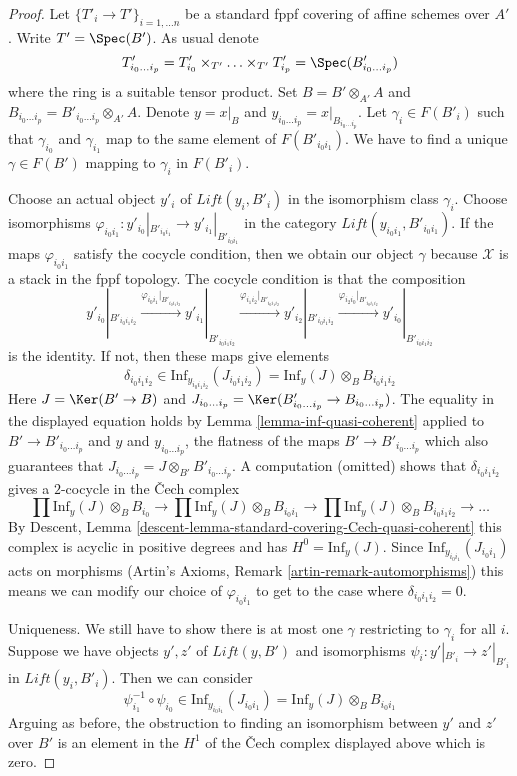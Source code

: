\begin{proof}
Let $\{T'_i \to T'\}_{i = 1, \ldots n}$ be a standard fppf covering
of affine schemes over $A'$. Write $T' = \Spec(B')$. As usual denote
$$
T'_{i_0 \ldots i_p} =
T'_{i_0} \times_{T'} \ldots \times_{T'} T'_{i_p} = \Spec(B'_{i_0 \ldots i_p})
$$
where the ring is a suitable tensor product.
Set $B = B' \otimes_{A'} A$ and
$B_{i_0 \ldots i_p} = B'_{i_0 \ldots i_p} \otimes_{A'} A$.
Denote $y = x|_B$ and $y_{i_0 \ldots i_p} = x|_{B_{i_0 \ldots i_p}}$.
Let $\gamma_i \in F(B'_i)$ such that $\gamma_{i_0}$ and $\gamma_{i_1}$
map to the same element of $F(B'_{i_0i_1})$.
We have to find a unique $\gamma \in F(B')$ mapping to
$\gamma_i$ in $F(B'_i)$.

\medskip\noindent
Choose an actual object $y'_i$ of $\textit{Lift}(y_i, B'_i)$
in the isomorphism class $\gamma_i$.
Choose isomorphisms
$\varphi_{i_0i_1} : y'_{i_0}|_{B'_{i_0i_1}} \to y'_{i_1}|_{B'_{i_0i_1}}$
in the category $\textit{Lift}(y_{i_0i_1}, B'_{i_0i_1})$.
If the maps $\varphi_{i_0i_1}$ satisfy the cocycle condition,
then we obtain our object $\gamma$ because $\mathcal{X}$ is
a stack in the fppf topology. The cocycle condition is that the
composition
$$
y'_{i_0}|_{B'_{i_0i_1i_2}}
\xrightarrow{\varphi_{i_0i_1}|_{B'_{i_0i_1i_2}}}
y'_{i_1}|_{B'_{i_0i_1i_2}}
\xrightarrow{\varphi_{i_1i_2}|_{B'_{i_0i_1i_2}}}
y'_{i_2}|_{B'_{i_0i_1i_2}}
\xrightarrow{\varphi_{i_2i_0}|_{B'_{i_0i_1i_2}}}
y'_{i_0}|_{B'_{i_0i_1i_2}}
$$
is the identity. If not, then these maps give elements
$$
\delta_{i_0i_1i_2} \in
\text{Inf}_{y_{i_0i_1i_2}}(J_{i_0i_1i_2}) =
\text{Inf}_y(J) \otimes_B B_{i_0i_1i_2}
$$
Here $J = \Ker(B' \to B)$ and
$J_{i_0 \ldots i_p} = \Ker(B'_{i_0 \ldots i_p} \to B_{i_0 \ldots i_p})$.
The equality in the displayed equation holds by
Lemma \ref{lemma-inf-quasi-coherent} applied to
$B' \to B'_{i_0 \ldots i_p}$ and $y$ and $y_{i_0 \ldots i_p}$,
the flatness of the maps $B' \to B'_{i_0 \ldots i_p}$
which also guarantees that
$J_{i_0 \ldots i_p} = J \otimes_{B'} B'_{i_0 \ldots i_p}$.
A computation (omitted) shows that $\delta_{i_0i_1i_2}$ gives
a $2$-cocycle in the {\v C}ech complex
$$
\prod \text{Inf}_y(J) \otimes_B B_{i_0} \to
\prod \text{Inf}_y(J) \otimes_B B_{i_0i_1} \to
\prod \text{Inf}_y(J) \otimes_B B_{i_0i_1i_2} \to \ldots
$$
By Descent, Lemma \ref{descent-lemma-standard-covering-Cech-quasi-coherent}
this complex is acyclic in positive degrees and has $H^0 = \text{Inf}_y(J)$.
Since $\text{Inf}_{y_{i_0i_1}}(J_{i_0i_1})$ acts on
morphisms (Artin's Axioms, Remark \ref{artin-remark-automorphisms})
this means we can modify our choice of $\varphi_{i_0i_1}$
to get to the case where $\delta_{i_0i_1i_2} = 0$.

\medskip\noindent
Uniqueness. We still have to show there is at most one $\gamma$ restricting
to $\gamma_i$ for all $i$. Suppose we have objects $y', z'$ of
$\textit{Lift}(y, B')$ and isomorphisms $\psi_i : y'|_{B'_i} \to z'|_{B'_i}$
in $\textit{Lift}(y_i, B'_i)$. Then we can consider
$$
\psi_{i_1}^{-1} \circ \psi_{i_0} \in
\text{Inf}_{y_{i_0i_1}}(J_{i_0i_1}) =
\text{Inf}_y(J) \otimes_B B_{i_0i_1}
$$
Arguing as before, the obstruction to finding an isomorphism between
$y'$ and $z'$ over $B'$ is an element in the $H^1$ of the
{\v C}ech complex displayed above which is zero.
\end{proof}

